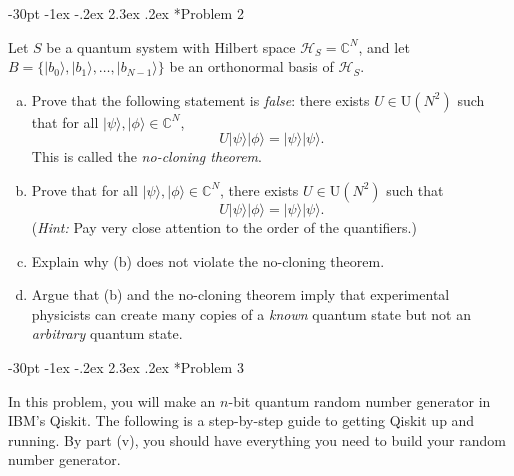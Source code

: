 \documentclass[10pt, cm]{article}
\makeatletter
\renewcommand\section{\@startsection {section}{1}{\z@}
{-30pt \@plus -1ex \@minus -.2ex}
{2.3ex \@plus.2ex}
{\center\normalfont\normalsize\bfseries}}
\newcommand{\problem}[1]{\section*{\smalltt Problem #1}}
\newcommand{\solution}{\hspace{-0.4cm}\hrulefill \vspace{0.4cm}}
\newcommand{\CC}{\mathbb{C}}		%
\newcommand{\U}{\mathrm{U}}		%
\renewcommand{\H}{\mathcal{H}}		%
\renewcommand{\ket}[1]{|#1\rangle}		%
\makeatother
\begin{document}
\clearpage

\problem{2}

Let $S$ be a quantum system with Hilbert space $\H_S = \CC^N$, and let $B = \{\ket{b_0}, \ket{b_1}, \dots, \ket{b_{N-1}}\}$ be an orthonormal basis of $\H_S$. 

\begin{enumerate}[(a)]
\item Prove that the following statement is \emph{false}: there exists $U \in \U(N^2)$ such that for all $\ket{\psi}, \ket{\phi} \in \CC^N$,
$$
U \ket{\psi}\ket{\phi} = \ket{\psi}\ket{\psi}.
$$
This is called the \emph{no-cloning theorem}.
\item Prove that for all $\ket{\psi}, \ket{\phi} \in \CC^N$, there exists $U \in \U(N^2)$ such that
$$
U \ket{\psi}\ket{\phi} = \ket{\psi}\ket{\psi}.
$$
(\emph{Hint:} Pay very close attention to the order of the quantifiers.)
\item Explain why (b) does not violate the no-cloning theorem. 
\item Argue that (b) and the no-cloning theorem imply that experimental physicists can create many copies of a \emph{known} quantum state but not an \emph{arbitrary} quantum state.
\end{enumerate}

\solution

\clearpage

\problem{3}

In this problem, you will make an $n$-bit quantum random number generator in IBM's Qiskit. The following is a step-by-step guide to getting Qiskit up and running. By part (v), you should have everything you need to build your random number generator.
\end{document}
